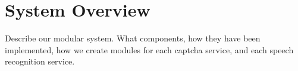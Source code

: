 \section{System Overview}
\label{sec:system}

Describe our modular system. What components, how they have been implemented, 
how we create modules for each captcha service, and each speech recognition 
service.
